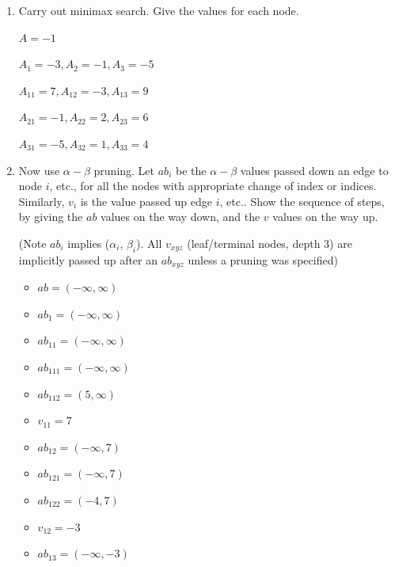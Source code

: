 \documentclass[11pt]{article}
\begin{document}
\begin{enumerate}

\item Carry out minimax search.  Give the values for each node.

$A = -1$

$A_1 = -3, A_2 = -1, A_3 = -5$

$A_{11} = 7, A_{12} = -3, A_{13} = 9$

$A_{21} = -1, A_{22} = 2, A_{23} = 6$

$A_{31} = -5, A_{32} = 1, A_{33} = 4$

\item Now use $\alpha-\beta$ pruning.  Let $ab_{i}$ be the
  $\alpha-\beta$ values passed down an edge to node $i$, etc., for all
  the nodes with appropriate change of index or indices.  Similarly,
  $v_i$ is the value passed up edge $i$, etc..  Show the sequence of
  steps, by giving the $ab$ values on the way down, and the $v$ values
  on the way up.

  (Note $ab_i$ implies ($\alpha_i$, $\beta_i$). All $v_{xyz}$ (leaf/terminal nodes, depth 3) are implicitly passed up after an $ab_{xyz}$ unless a pruning was specified)

  \begin{itemize}
    \item 
    $ab = (-\infty, \infty)$

    \item 
    $ab_1 = (-\infty, \infty)$

    \item 
    $ab_{11} = (-\infty, \infty)$
    
    \item 
    $ab_{111} = (-\infty, \infty)$

    \item 
    $ab_{112} = (5, \infty)$

    \item 
    $v_{11} = 7$

    \item 
    $ab_{12} = (-\infty, 7)$

    \item 
    $ab_{121} = (-\infty, 7)$

    \item 
    $ab_{122} = (-4, 7)$

    \item 
    $v_{12} = -3$

    \item 
    $ab_{13} = (-\infty, -3)$


\end{itemize}
\end{enumerate}
\end{document}
